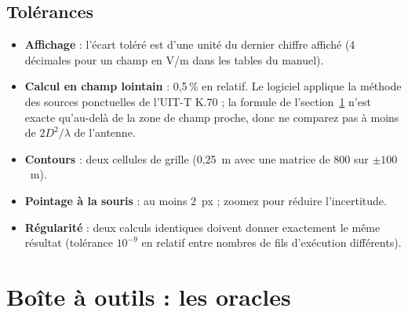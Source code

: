 \subsection{Tolérances}\label{sec:tol}
\begin{itemize}
\item \textbf{Affichage} : l'écart toléré est d'une unité du dernier chiffre affiché (4 décimales pour un champ en V/m dans les tables du manuel).
\item \textbf{Calcul en champ lointain} : 0,5\,\% en relatif. Le logiciel applique la méthode des sources ponctuelles de l'UIT-T K.70 ; la formule de l'section~\ref{sec:formules} n'est exacte qu'au-delà de la zone de champ proche, donc ne comparez pas à moins de $2D^2/\lambda$ de l'antenne.
\item \textbf{Contours} : deux cellules de grille (0,25~m avec une matrice de 800 sur $\pm100$~m).
\item \textbf{Pointage à la souris} : au moins 2~px ; zoomez pour réduire l'incertitude.
\item \textbf{Régularité} : deux calculs identiques doivent donner exactement le même résultat (tolérance $10^{-9}$ en relatif entre nombres de fils d'exécution différents).
\end{itemize}

\section{Boîte à outils : les oracles}\label{sec:formules}
